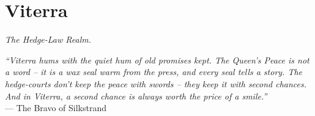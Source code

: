 \documentclass[12pt,oneside]{book}
\begin{document}


\newpage

\chapter{Viterra}
\emph{The Hedge-Law Realm.}

\noindent
\textit{``Viterra hums with the quiet hum of old promises kept. The Queen's Peace is not a word -- it is a wax seal warm from the press, and every seal tells a story. The hedge-courts don't keep the peace with swords -- they keep it with second chances. And in Viterra, a second chance is always worth the price of a smile.''} \\
--- The Bravo of Silkstrand

\vspace{1em}
\end{document}
